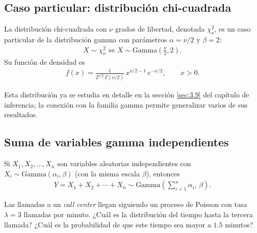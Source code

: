 \subsection{Caso particular: distribución chi-cuadrada}

La distribución chi-cuadrada con $\nu$ grados de libertad, denotada $\chi^2_\nu$, es
un caso particular de la distribución gamma con parámetros
$\alpha = \nu/2$ y $\beta = 2$:
\begin{align}
 \label{eq:2.8.9}
 X \sim \chi^2_\nu \iff X \sim \text{Gamma}\!\left(\frac{\nu}{2}, 2\right).
\end{align}
Su función de densidad es
\begin{align}
 f(x) = \frac{1}{2^{\nu/2}\,\Gamma(\nu/2)}\,x^{\nu/2-1}\,e^{-x/2}, \qquad x > 0.
\end{align}

Esta distribución ya se estudia en detalle en la sección \ref{sec:3.9} del capítulo
de inferencia; la conexión con la familia gamma permite generalizar varios de sus
resultados.

\subsection{Suma de variables gamma independientes}

\begin{teorema}
Si $X_1, X_2, \dots, X_n$ son variables aleatorias independientes con
$X_i \sim \text{Gamma}(\alpha_i, \beta)$ (con la misma escala $\beta$), entonces
\begin{align}
 \label{eq:2.8.10}
 Y = X_1 + X_2 + \cdots + X_n \sim \text{Gamma}\!\left(\sum_{i=1}^n \alpha_i,\, \beta\right).
\end{align}
\end{teorema}

\begin{ejemplo}
 \label{exmp:2.8.3}
Las llamadas a un \emph{call center} llegan siguiendo un proceso de Poisson con tasa
$\lambda = 3$ llamadas por minuto. ¿Cuál es la distribución del tiempo hasta la
tercera llamada? ¿Cuál es la probabilidad de que este tiempo sea mayor a $1.5$ minutos?
\end{ejemplo}

